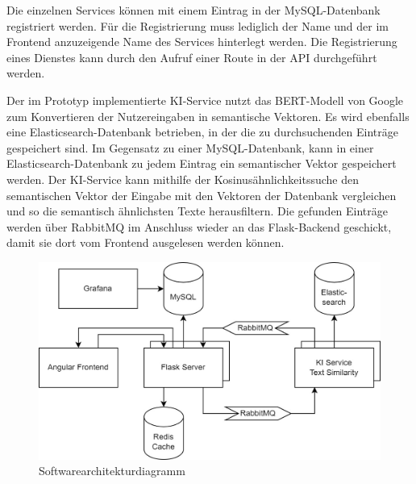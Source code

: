 Die einzelnen Services können mit einem Eintrag in der MySQL-Datenbank registriert werden. Für die Registrierung muss lediglich der Name und der im Frontend anzuzeigende Name des Services hinterlegt werden. Die Registrierung eines Dienstes kann durch den Aufruf einer Route in der API durchgeführt werden. 

Der im Prototyp implementierte KI-Service nutzt das BERT-Modell von Google zum Konvertieren der Nutzereingaben in semantische Vektoren. Es wird ebenfalls eine Elasticsearch-Datenbank betrieben, in der die zu durchsuchenden Einträge gespeichert sind. Im Gegensatz zu einer MySQL-Datenbank, kann in einer Elasticsearch-Datenbank zu jedem Eintrag ein semantischer Vektor gespeichert werden. Der KI-Service kann mithilfe der Kosinusähnlichkeitssuche den semantischen Vektor der Eingabe mit den Vektoren der Datenbank vergleichen und so die semantisch ähnlichsten Texte herausfiltern. Die gefunden Einträge werden über RabbitMQ im Anschluss wieder an das Flask-Backend geschickt, damit sie dort vom Frontend ausgelesen werden können.

\begin{figure}[H]
  \centering
    \includegraphics[width = 12cm]{bilder/Architektur}
    \caption{Softwarearchitekturdiagramm}
\end{figure}

